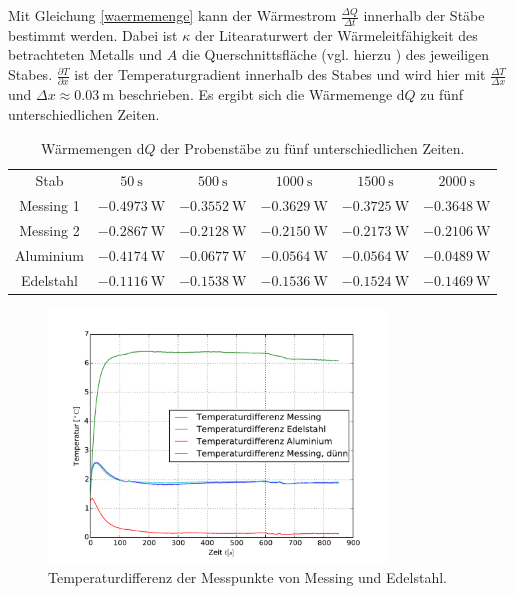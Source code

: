 Mit Gleichung \eqref{waermemenge} kann der Wärmestrom $\frac{\Delta{Q}}{\Delta{t}}$ innerhalb der Stäbe bestimmt werden. 
Dabei ist $\kappa$ der Litearaturwert der Wärmeleitfähigkeit des betrachteten Metalls und $A$ die Querschnittsfläche (vgl. hierzu \cite{V204}) des jeweiligen Stabes.
$\frac{\partial T}{\partial x}$ ist der Temperaturgradient innerhalb des Stabes und wird hier mit $\frac{\Delta T}{\Delta x}$ und $\Delta x \approx \SI{0.03}{\meter}$ beschrieben.
Es ergibt sich die Wärmemenge $\mathup{d}Q$ zu fünf unterschiedlichen Zeiten.
\begin{table}
	\centering
	\begin{tabular}{cccccc}
	\sisetup{table-format=1.4}\\
	\toprule
	Stab & $50\:\si\second$ & $500\:\si\second$ & $1000\:\si\second$ & $1500\:\si\second$ & $2000\:\si\second$ \\
	\midrule
	Messing 1 &$-0.4973\:\si{\watt}$ &$-0.3552\:\si{\watt}$&$-0.3629\:\si{\watt}$&$-0.3725\:\si{\watt}$&$-0.3648\:\si{\watt}$\\
	Messing 2 &$-0.2867\:\si{\watt}$& $-0.2128\:\si{\watt}$&$-0.2150\:\si{\watt}$&$-0.2173\:\si{\watt}$&$-0.2106\:\si{\watt}$\\
	Aluminium &$-0.4174\:\si{\watt}$&$-0.0677\:\si{\watt}$&$-0.0564\:\si{\watt}$&$-0.0564\:\si{\watt}$&$-0.0489\:\si{\watt}$\\
	Edelstahl &$-0.1116\:\si{\watt}$&$-0.1538\:\si{\watt}$&$-0.1536\:\si{\watt}$&$-0.1524\:\si{\watt}$&$-0.1469\:\si{\watt}$\\
	\bottomrule
	\end{tabular}
	\caption{Wärmemengen d$Q$ der Probenstäbe zu fünf unterschiedlichen Zeiten.}
	\label{tab:waememengen}
\end{table}
\begin{figure}
	\centering
	\includegraphics[width=0.8\textwidth]{Bilder/M1_Tempdiff.pdf}
	\caption{Temperaturdifferenz der Messpunkte von Messing und Edelstahl.}
	\label{fig:tempverl}
\end{figure}

